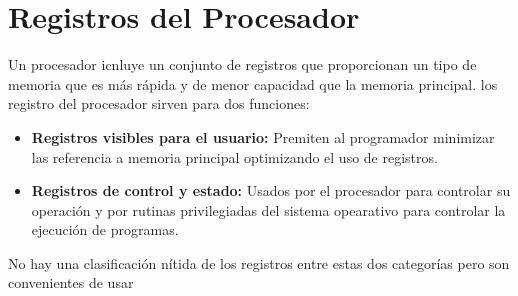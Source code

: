 \documentclass[12pt, a4paper]{article}
\begin{document}
\section{Registros del Procesador}
Un procesador icnluye un conjunto de registros que proporcionan un tipo de memoria que es más rápida y de menor capacidad que la memoria principal. los registro del procesador sirven para dos funciones:
\begin{itemize}
    \item \textbf{Registros visibles para el usuario:} Premiten al programador minimizar las referencia a memoria principal optimizando el uso de registros.
    \item \textbf{Registros de control y estado:} Usados por el procesador para controlar su operación y por rutinas privilegiadas del sistema opearativo para controlar la ejecución de programas.
\end{itemize}
\begin{tcolorbox}[colback=cyan!10, colframe=blue!70, title=Nota]
No hay una clasificación nítida de los registros entre estas dos categorías pero son convenientes de usar
\end{tcolorbox}
\end{document}
